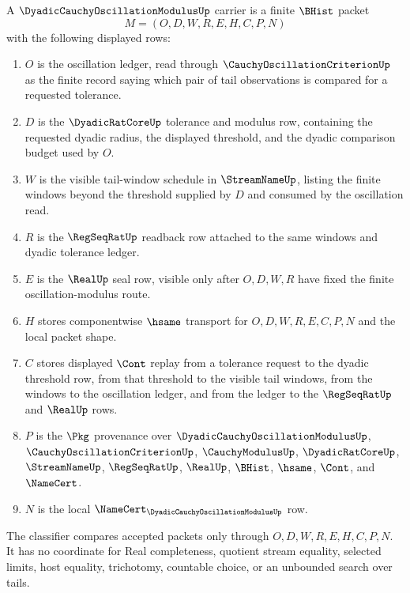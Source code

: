 \begin{definition}
\label{def:dyadic-cauchy-oscillation-modulus-carrier}
A $\DyadicCauchyOscillationModulusUp$ carrier is a finite $\BHist$ packet
$$
M=(O,D,W,R,E,H,C,P,N)
$$
with the following displayed rows:
\begin{enumerate}
\item $O$ is the oscillation ledger, read through $\CauchyOscillationCriterionUp$ as the finite record saying which pair of tail observations is compared for a requested tolerance.
\item $D$ is the $\DyadicRatCoreUp$ tolerance and modulus row, containing the requested dyadic radius, the displayed threshold, and the dyadic comparison budget used by $O$.
\item $W$ is the visible tail-window schedule in $\StreamNameUp$, listing the finite windows beyond the threshold supplied by $D$ and consumed by the oscillation read.
\item $R$ is the $\RegSeqRatUp$ readback row attached to the same windows and dyadic tolerance ledger.
\item $E$ is the $\RealUp$ seal row, visible only after $O,D,W,R$ have fixed the finite oscillation-modulus route.
\item $H$ stores componentwise $\hsame$ transport for $O,D,W,R,E,C,P,N$ and the local packet shape.
\item $C$ stores displayed $\Cont$ replay from a tolerance request to the dyadic threshold row, from that threshold to the visible tail windows, from the windows to the oscillation ledger, and from the ledger to the $\RegSeqRatUp$ and $\RealUp$ rows.
\item $P$ is the $\Pkg$ provenance over $\DyadicCauchyOscillationModulusUp$, $\CauchyOscillationCriterionUp$, $\CauchyModulusUp$, $\DyadicRatCoreUp$, $\StreamNameUp$, $\RegSeqRatUp$, $\RealUp$, $\BHist$, $\hsame$, $\Cont$, and $\NameCert$.
\item $N$ is the local $\NameCert_{\DyadicCauchyOscillationModulusUp}$ row.
\end{enumerate}
The classifier compares accepted packets only through $O,D,W,R,E,H,C,P,N$. It has no coordinate for Real completeness, quotient stream equality, selected limits, host equality, trichotomy, countable choice, or an unbounded search over tails.
\end{definition}

